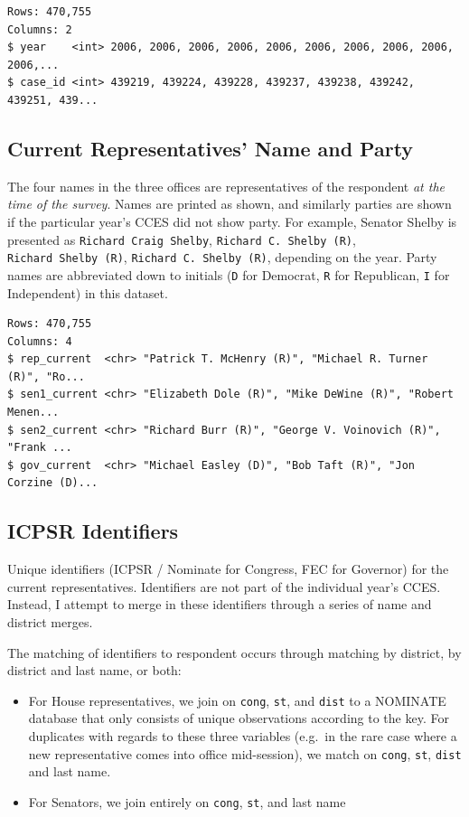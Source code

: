 \documentclass[10pt,article,oneside]{memoir}
\theoremstyle{definition}
\begin{document}
\begin{verbatim}
Rows: 470,755
Columns: 2
$ year    <int> 2006, 2006, 2006, 2006, 2006, 2006, 2006, 2006, 2006, 2006,...
$ case_id <int> 439219, 439224, 439228, 439237, 439238, 439242, 439251, 439...
\end{verbatim}

\hypertarget{current-representatives-name-and-party}{%
\subsection{Current Representatives' Name and
Party}\label{current-representatives-name-and-party}}

The four names in the three offices are representatives of the
respondent \emph{at the time of the survey}. Names are printed as shown,
and similarly parties are shown if the particular year's CCES did not
show party. For example, Senator Shelby is presented as
\texttt{Richard\ Craig\ Shelby}, \texttt{Richard\ C.\ Shelby\ (R)},
\texttt{Richard\ Shelby\ (R)}, \texttt{Richard\ C.\ Shelby\ (R)},
depending on the year. Party names are abbreviated down to initials
(\texttt{D} for Democrat, \texttt{R} for Republican, \texttt{I} for
Independent) in this dataset.

\begin{verbatim}
Rows: 470,755
Columns: 4
$ rep_current  <chr> "Patrick T. McHenry (R)", "Michael R. Turner (R)", "Ro...
$ sen1_current <chr> "Elizabeth Dole (R)", "Mike DeWine (R)", "Robert Menen...
$ sen2_current <chr> "Richard Burr (R)", "George V. Voinovich (R)", "Frank ...
$ gov_current  <chr> "Michael Easley (D)", "Bob Taft (R)", "Jon Corzine (D)...
\end{verbatim}

\hypertarget{icpsr-identifiers}{%
\subsection{ICPSR Identifiers}\label{icpsr-identifiers}}

Unique identifiers (ICPSR / Nominate for Congress, FEC for Governor) for
the current representatives. Identifiers are not part of the individual
year's CCES. Instead, I attempt to merge in these identifiers through a
series of name and district merges.

The matching of identifiers to respondent occurs through matching by
district, by district and last name, or both:

\begin{itemize}
\tightlist
\item
  For House representatives, we join on \texttt{cong}, \texttt{st}, and
  \texttt{dist} to a NOMINATE database that only consists of unique
  observations according to the key. For duplicates with regards to
  these three variables (e.g.~in the rare case where a new
  representative comes into office mid-session), we match on
  \texttt{cong}, \texttt{st}, \texttt{dist} and last name.
\item
  For Senators, we join entirely on \texttt{cong}, \texttt{st}, and last
  name
\end{itemize}
\end{document}
